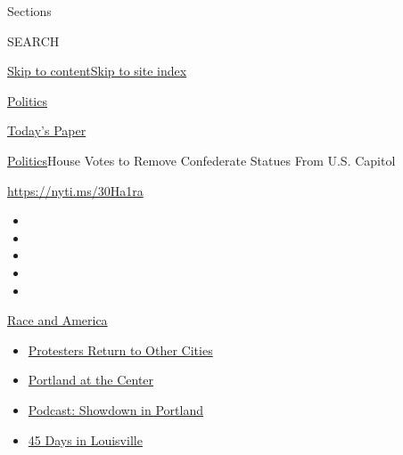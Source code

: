Sections

SEARCH

\protect\hyperlink{site-content}{Skip to
content}\protect\hyperlink{site-index}{Skip to site index}

\href{https://www.nytimes.com/section/politics}{Politics}

\href{https://myaccount.nytimes.com/auth/login?response_type=cookie\&client_id=vi}{}

\href{https://www.nytimes.com/section/todayspaper}{Today's Paper}

\href{/section/politics}{Politics}\textbar{}House Votes to Remove
Confederate Statues From U.S. Capitol

\url{https://nyti.ms/30Ha1ra}

\begin{itemize}
\item
\item
\item
\item
\item
\end{itemize}

\href{https://www.nytimes.com/news-event/george-floyd-protests-minneapolis-new-york-los-angeles?action=click\&pgtype=Article\&state=default\&region=TOP_BANNER\&context=storylines_menu}{Race
and America}

\begin{itemize}
\tightlist
\item
  \href{https://www.nytimes.com/2020/07/26/us/protests-portland-seattle-trump.html?action=click\&pgtype=Article\&state=default\&region=TOP_BANNER\&context=storylines_menu}{Protesters
  Return to Other Cities}
\item
  \href{https://www.nytimes.com/2020/07/24/us/portland-oregon-protests-white-race.html?action=click\&pgtype=Article\&state=default\&region=TOP_BANNER\&context=storylines_menu}{Portland
  at the Center}
\item
  \href{https://www.nytimes.com/2020/07/23/podcasts/the-daily/portland-protests.html?action=click\&pgtype=Article\&state=default\&region=TOP_BANNER\&context=storylines_menu}{Podcast:
  Showdown in Portland}
\item
  \href{https://www.nytimes.com/interactive/2020/07/16/us/black-lives-matter-protests-louisville-breonna-taylor.html?action=click\&pgtype=Article\&state=default\&region=TOP_BANNER\&context=storylines_menu}{45
  Days in Louisville}
\end{itemize}

